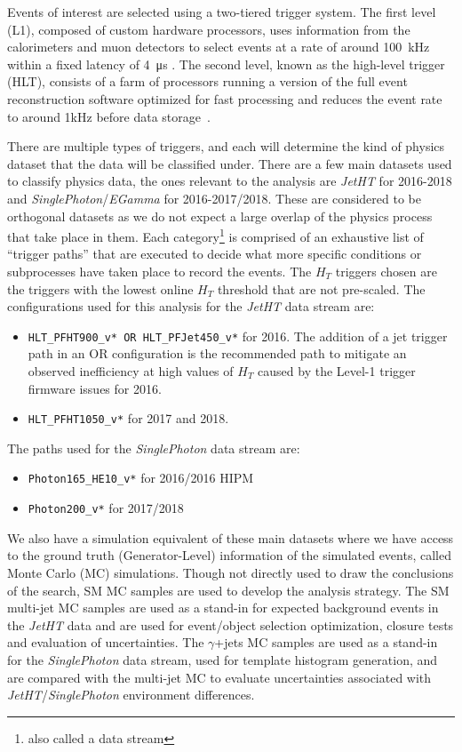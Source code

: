 Events of interest are selected using a two-tiered trigger system. The first level (L1), composed of custom hardware processors, uses information from the calorimeters and muon detectors to select events at a rate of around 100~\unit{kHz} within a fixed latency of 4~\unit{\us} \cite{CMS:2020cmk}. The second level, known as the high-level trigger (HLT), consists of a farm of processors running a version of the full event reconstruction software optimized for fast processing and reduces the event rate to around 1\unit{kHz} before data storage~\cite{CMS:2016ngn}.

There are multiple types of triggers, and each will determine the kind of physics dataset that the data will be classified under. There are a few main datasets used to classify physics data, the ones relevant to the analysis are \emph{JetHT} for 2016-2018 and \emph{SinglePhoton}/\emph{EGamma} for 2016-2017/2018. These are considered to be orthogonal datasets as we do not expect a large overlap of the physics process that take place in them. Each category\footnote{also called a data stream} is comprised of an exhaustive list of ``trigger paths'' that are executed to decide what more specific conditions or subprocesses have taken place to record the events.
The $H_T$ triggers chosen are the triggers with the lowest online $H_T$ threshold that are not pre-scaled. The configurations used for this analysis for the \textit{JetHT} data stream are:

\begin{itemize}
	\item \verb|HLT_PFHT900_v* OR HLT_PFJet450_v*| for 2016. The addition of a jet trigger path in an OR configuration is the recommended path to mitigate an observed inefficiency at high values of $H_T$ caused by the Level-1 trigger firmware issues for 2016.
	\item \verb|HLT_PFHT1050_v*| for 2017 and 2018.
\end{itemize}

The paths used for the \textit{SinglePhoton} data stream are:
\begin{itemize}
	\item \verb|Photon165_HE10_v*| for 2016/2016 HIPM
	\item \verb|Photon200_v*| for 2017/2018
\end{itemize}

We also have a simulation equivalent of these main datasets where we have access to the ground truth (Generator-Level) information of the simulated events, called Monte Carlo (MC) simulations.
Though not directly used to draw the conclusions of the search, SM MC samples are used to develop the analysis strategy. The SM multi-jet MC samples are used as a stand-in for expected background events in the \textit{JetHT} data and are used for event/object selection optimization, closure tests and evaluation of uncertainties. The $\gamma$+jets MC samples are used as a stand-in for the \textit{SinglePhoton} data stream, used for template histogram generation, and are compared with the multi-jet MC to evaluate uncertainties associated with \textit{JetHT}/\textit{SinglePhoton} environment differences\cite{CMS:2024gxp}.


